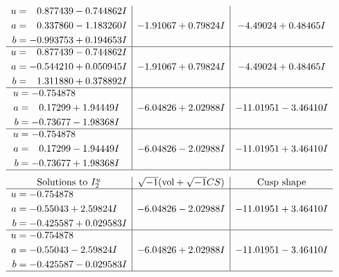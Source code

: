\documentclass[1p]{elsarticle_modified}
\theoremstyle{definition}
\newcommand{\I}{\sqrt{-1}}
\begin{document}
$$\begin{array}{c|c|c}
\begin{aligned}
u &= \phantom{-}0.877439 - 0.744862 I \\
a &= \phantom{-}0.337860 - 1.183260 I \\
b &= -0.993753 + 0.194653 I\end{aligned}
 & -1.91067 + 0.79824 I & -4.49024 + 0.48465 I \\ \hline\begin{aligned}
u &= \phantom{-}0.877439 - 0.744862 I \\
a &= -0.544210 + 0.050945 I \\
b &= \phantom{-}1.311880 + 0.378892 I\end{aligned}
 & -1.91067 + 0.79824 I & -4.49024 + 0.48465 I \\ \hline\begin{aligned}
u &= -0.754878\phantom{ +0.000000I} \\
a &= \phantom{-}0.17299 + 1.94449 I \\
b &= -0.73677 - 1.98368 I\end{aligned}
 & -6.04826 + 2.02988 I & -11.01951 - 3.46410 I \\ \hline\begin{aligned}
u &= -0.754878\phantom{ +0.000000I} \\
a &= \phantom{-}0.17299 - 1.94449 I \\
b &= -0.73677 + 1.98368 I\end{aligned}
 & -6.04826 - 2.02988 I & -11.01951 + 3.46410 I\\
 \hline 
 \end{array}$$\newpage$$\begin{array}{c|c|c}  
\text{Solutions to }I^u_{2}& \I (\text{vol} + \sqrt{-1}CS) & \text{Cusp shape}\\
 \hline 
\begin{aligned}
u &= -0.754878\phantom{ +0.000000I} \\
a &= -0.55043 + 2.59824 I \\
b &= -0.425587 + 0.029583 I\end{aligned}
 & -6.04826 - 2.02988 I & -11.01951 + 3.46410 I \\ \hline\begin{aligned}
u &= -0.754878\phantom{ +0.000000I} \\
a &= -0.55043 - 2.59824 I \\
b &= -0.425587 - 0.029583 I\end{aligned}
 & -6.04826 + 2.02988 I & -11.01951 - 3.46410 I\\
 \hline 
 \end{array}$$\newpage\newpage\renewcommand{\arraystretch}{1}
\end{document}
